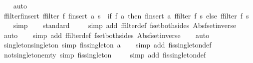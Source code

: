 \begin{isabellebody}
\ \ \isamarkupfalse%
\ auto%
\endisatagproof
{\isafoldproof}%
%
\isadelimproof
\isanewline
%
\endisadelimproof
\isanewline
{}\isamarkupfalse%
\ ffilter{\isacharunderscore}finsert{\isacharcolon}\ {\isachardoublequoteopen}ffilter\ f\ {\isacharparenleft}finsert\ a\ s{\isacharparenright}\ {\isacharequal}\ {\isacharparenleft}if\ f\ a\ then\ finsert\ a\ {\isacharparenleft}ffilter\ f\ s{\isacharparenright}\ else\ {\isacharparenleft}ffilter\ f\ s{\isacharparenright}{\isacharparenright}{\isachardoublequoteclose}\isanewline
%
\isadelimproof
\ \ %
\endisadelimproof
%
\isatagproof
{}\isamarkupfalse%
\ simp\isanewline
\ \ \isamarkupfalse%
\ standard\isanewline
\ \ \ \isamarkupfalse%
\ {\isacharparenleft}simp\ add{\isacharcolon}\ ffilter{\isacharunderscore}def\ fset{\isacharunderscore}both{\isacharunderscore}sides\ Abs{\isacharunderscore}fset{\isacharunderscore}inverse{\isacharparenright}\isanewline
\ \ \ \isamarkupfalse%
\ auto{\isacharbrackleft}{}{\isacharbrackright}\isanewline
\ \ \isamarkupfalse%
\ {\isacharparenleft}simp\ add{\isacharcolon}\ ffilter{\isacharunderscore}def\ fset{\isacharunderscore}both{\isacharunderscore}sides\ Abs{\isacharunderscore}fset{\isacharunderscore}inverse{\isacharparenright}\isanewline
\ \ \isamarkupfalse%
\ auto%
\endisatagproof
{\isafoldproof}%
%
\isadelimproof
\isanewline
%
\endisadelimproof
\isanewline
{}\isamarkupfalse%
\ singleton{\isacharunderscore}singleton\ {\isacharbrackleft}simp{\isacharbrackright}{\isacharcolon}\ {\isachardoublequoteopen}fis{\isacharunderscore}singleton\ {\isacharbraceleft}{\isacharbar}a{\isacharbar}{\isacharbraceright}{\isachardoublequoteclose}\isanewline
%
\isadelimproof
\ \ %
\endisadelimproof
%
\isatagproof
{}\isamarkupfalse%
\ {\isacharparenleft}simp\ add{\isacharcolon}\ fis{\isacharunderscore}singleton{\isacharunderscore}def{\isacharparenright}%
\endisatagproof
{\isafoldproof}%
%
\isadelimproof
\isanewline
%
\endisadelimproof
\isanewline
{}\isamarkupfalse%
\ not{\isacharunderscore}singleton{\isacharunderscore}emty\ {\isacharbrackleft}simp{\isacharbrackright}{\isacharcolon}\ {\isachardoublequoteopen}{\isasymnot}fis{\isacharunderscore}singleton\ {\isacharbraceleft}{\isacharbar}{\isacharbar}{\isacharbraceright}{\isachardoublequoteclose}\isanewline
%
\isadelimproof
\ \ %
\endisadelimproof
%
\isatagproof
{}\isamarkupfalse%
\ {\isacharparenleft}simp\ add{\isacharcolon}\ fis{\isacharunderscore}singleton{\isacharunderscore}def{\isacharparenright}\isanewline

\end{isabellebody}

